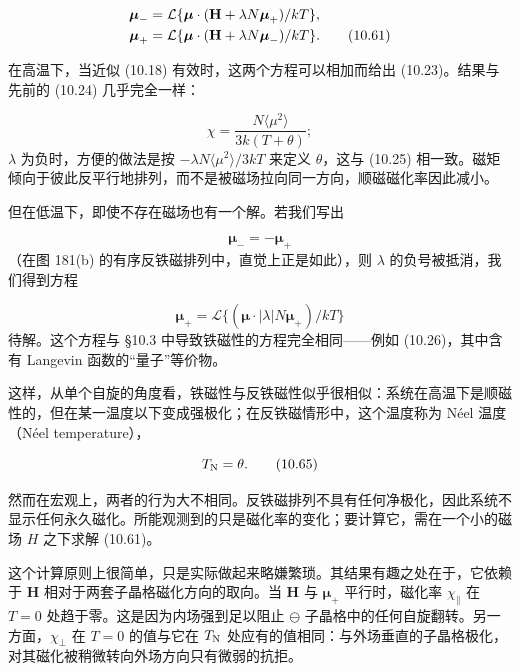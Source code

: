 \begin{align*}
\boldsymbol{\mu}_- &= \mathcal{L}\{\boldsymbol{\mu}\cdot(\mathbf{H}+\lambda N\boldsymbol{\mu}_+)/kT\}, \notag \\
\boldsymbol{\mu}_+ &= \mathcal{L}\{\boldsymbol{\mu}\cdot(\mathbf{H}+\lambda N\boldsymbol{\mu}_-)/kT\}. \tag{10.61}
\end{align*}

在高温下，当近似 (10.18) 有效时，这两个方程可以相加而给出 (10.23)。结果与先前的 (10.24) 几乎完全一样：

\begin{equation*}
\chi = \frac{N\langle\mu^2\rangle}{3k(T+\theta)}; \tag{10.62}
\end{equation*}
$\lambda$ 为负时，方便的做法是按 $-\lambda N\langle\mu^2\rangle/3kT$ 来定义 $\theta$，这与 (10.25) 相一致。磁矩倾向于彼此反平行地排列，而不是被磁场拉向同一方向，顺磁磁化率因此减小。

但在低温下，即使不存在磁场也有一个解。若我们写出

\begin{equation*}
\boldsymbol{\mu}_- = -\boldsymbol{\mu}_+ \tag{10.63}
\end{equation*}
（在图 181(b) 的有序反铁磁排列中，直觉上正是如此），则 $\lambda$ 的负号被抵消，我们得到方程

\begin{equation*}
\boldsymbol{\mu}_+ = \mathcal{L}\{(\boldsymbol{\mu}\cdot|\lambda|N\boldsymbol{\mu}_+)/kT\} \tag{10.64}
\end{equation*}
待解。这个方程与 §10.3 中导致铁磁性的方程完全相同——例如 (10.26)，其中含有 Langevin 函数的“量子”等价物。

这样，从单个自旋的角度看，铁磁性与反铁磁性似乎很相似：系统在高温下是顺磁性的，但在某一温度以下变成强极化；在反铁磁情形中，这个温度称为 Néel 温度（Néel temperature），

\begin{equation*}
T_{\rm N} = \theta. \tag{10.65}
\end{equation*}

然而在宏观上，两者的行为大不相同。反铁磁排列不具有任何净极化，因此系统不显示任何永久磁化。所能观测到的只是磁化率的变化；要计算它，需在一个小的磁场 $H$ 之下求解 (10.61)。


这个计算原则上很简单，只是实际做起来略嫌繁琐。其结果有趣之处在于，它依赖于 $\mathbf{H}$ 相对于两套子晶格磁化方向的取向。当 $\mathbf{H}$ 与 $\boldsymbol{\mu}_+$ 平行时，磁化率 $\chi_\parallel$ 在 $T=0$ 处趋于零。这是因为内场强到足以阻止 $\ominus$ 子晶格中的任何自旋翻转。另一方面，$\chi_\perp$ 在 $T=0$ 的值与它在 $T_{\rm N}$ 处应有的值相同：与外场垂直的子晶格极化，对其磁化被稍微转向外场方向只有微弱的抗拒。

